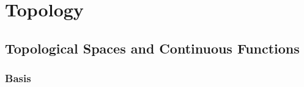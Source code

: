 
\chapter{Topology}

\section{Topological Spaces and Continuous Functions}







\subsection{Basis}
































